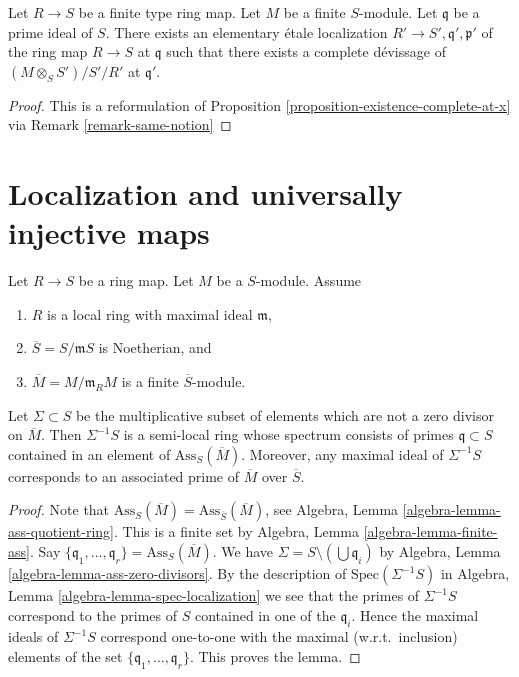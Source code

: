 \begin{lemma}
\label{lemma-existence-algebra}
Let $R \to S$ be a finite type ring map.
Let $M$ be a finite $S$-module.
Let $\mathfrak q$ be a prime ideal of $S$.
There exists an elementary \'etale localization
$R' \to S', \mathfrak q', \mathfrak p'$ of
the ring map $R \to S$ at $\mathfrak q$ such that
there exists a complete d\'evissage of
$(M \otimes_S S')/S'/R'$ at $\mathfrak q'$.
\end{lemma}

\begin{proof}
This is a reformulation of
Proposition \ref{proposition-existence-complete-at-x}
via
Remark \ref{remark-same-notion}
\end{proof}




\section{Localization and universally injective maps}
\label{section-localize-universally-injective}


\begin{lemma}
\label{lemma-homothety-spectrum}
Let $R \to S$ be a ring map.
Let $M$ be a $S$-module.
Assume
\begin{enumerate}
\item $R$ is a local ring with maximal ideal $\mathfrak m$,
\item $\overline{S} = S/\mathfrak m S$ is Noetherian, and
\item $\overline{M} = M/\mathfrak m_R M$ is a finite $\overline{S}$-module.
\end{enumerate}
Let $\Sigma \subset S$ be the multiplicative subset of elements which are not
a zero divisor on $\overline{M}$. Then $\Sigma^{-1}S$ is a semi-local ring
whose spectrum consists of primes $\mathfrak q \subset S$ contained in an
element of $\text{Ass}_S(\overline{M})$. Moreover, any maximal
ideal of $\Sigma^{-1}S$ corresponds to an associated prime of
$\overline{M}$ over $\overline{S}$.
\end{lemma}

\begin{proof}
Note that
$\text{Ass}_S(\overline{M}) = \text{Ass}_{\overline{S}}(\overline{M})$, see
Algebra, Lemma \ref{algebra-lemma-ass-quotient-ring}.
This is a finite set by
Algebra, Lemma \ref{algebra-lemma-finite-ass}.
Say $\{\mathfrak q_1, \ldots, \mathfrak q_r\} = \text{Ass}_S(\overline{M})$.
We have $\Sigma = S \setminus (\bigcup \mathfrak q_i)$ by
Algebra, Lemma \ref{algebra-lemma-ass-zero-divisors}.
By the description of $\text{Spec}(\Sigma^{-1}S)$ in
Algebra, Lemma \ref{algebra-lemma-spec-localization}
we see that the primes of $\Sigma^{-1}S$ correspond to the primes of
$S$ contained in one of the $\mathfrak q_i$.
Hence the maximal ideals of $\Sigma^{-1}S$ correspond one-to-one with the
maximal (w.r.t.\ inclusion) elements of the set
$\{\mathfrak q_1, \ldots, \mathfrak q_r\}$. This proves the lemma.
\end{proof}

